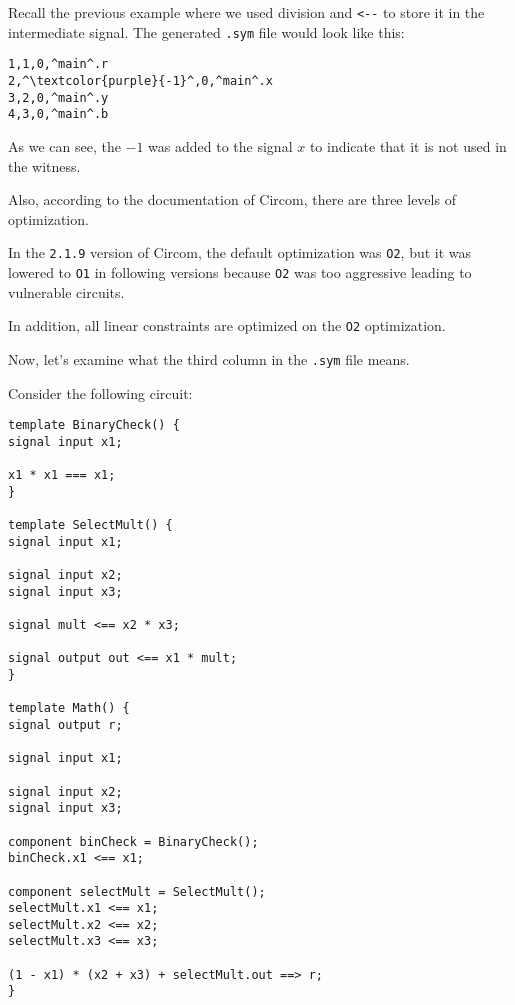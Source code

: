 \documentclass[../lecture-notes-148x210.tex]{subfiles}
\begin{document}
Recall the previous example where we used division and \texttt{<-{-}} to store it in the intermediate signal.
The generated \texttt{.sym} file would look like this:

\begin{center}
    \begin{tcolorbox}[enhanced,
        width=0.5\textwidth,
        title=\textbf{.sym file for $b \;\texttt{<-{-}}\; x/y, r \;\texttt{<==}\; by$},
        coltitle=gray!25!black,
        attach boxed title to top center={yshift=-2mm,yshifttext=-1mm},
        boxed title style={size=small,colframe=gray!75!black,
        colback=blue!30!white,boxrule=1pt},
        top=-0.35cm,
        bottom=-0.35cm]
        \begin{lstlisting}[language=Circom,numbers=none,basicstyle=\ttfamily\footnotesize,escapechar=^]
1,1,0,^main^.r
2,^\textcolor{purple}{-1}^,0,^main^.x
3,2,0,^main^.y
4,3,0,^main^.b
        \end{lstlisting}
    \end{tcolorbox}
\end{center}

As we can see, the $-1$ was added to the signal $x$ to indicate that it is not used in the witness.

Also, according to the documentation of Circom, there are three levels of optimization.

In the \texttt{2.1.9} version of Circom, the default optimization was \texttt{O2}, but it was lowered to \texttt{O1} in following versions because \texttt{O2} was too aggressive leading to vulnerable circuits.

\begin{remark}
    In addition, all linear constraints are optimized on the \texttt{O2} optimization.
\end{remark}

Now, let's examine what the third column in the \texttt{.sym} file means.

Consider the following circuit:

\begin{lstlisting}[language=Circom,basicstyle=\ttfamily\footnotesize]
template BinaryCheck() {
signal input x1;

x1 * x1 === x1;
}

template SelectMult() {
signal input x1;

signal input x2;
signal input x3;

signal mult <== x2 * x3;

signal output out <== x1 * mult;
}

template Math() {
signal output r;

signal input x1;

signal input x2;
signal input x3;

component binCheck = BinaryCheck();
binCheck.x1 <== x1;

component selectMult = SelectMult();
selectMult.x1 <== x1;
selectMult.x2 <== x2;
selectMult.x3 <== x3;

(1 - x1) * (x2 + x3) + selectMult.out ==> r;
}
\end{lstlisting}
\end{document}

